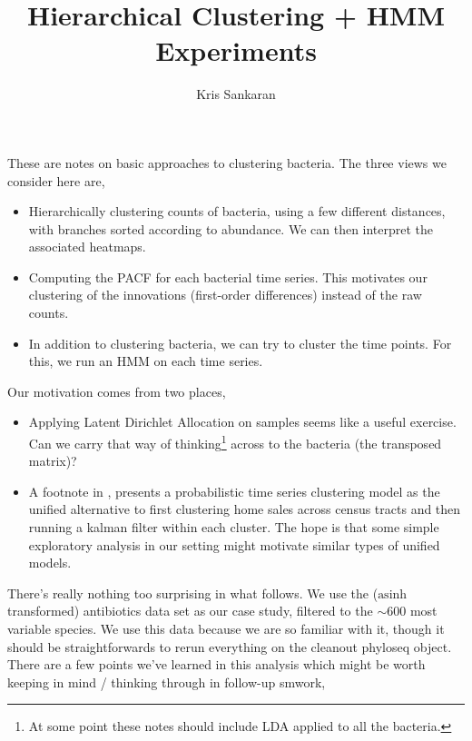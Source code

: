 \documentclass{article}
\title{Hierarchical Clustering + HMM Experiments}
\author{Kris Sankaran}
\begin{document}
\maketitle

These are notes on basic approaches to clustering bacteria. The
three views we consider here are,

\begin{itemize}
\item Hierarchically clustering counts of bacteria, using a few different
  distances, with branches sorted according to abundance. We can then interpret
  the associated heatmaps.
\item Computing the PACF for each bacterial time series. This motivates our
  clustering of the innovations (first-order differences) instead of the raw counts.
\item In addition to clustering bacteria, we can try to cluster the time points.
  For this, we run an HMM on each time series.
\end{itemize}


Our motivation comes from two places,
\begin{itemize}
  \item Applying Latent Dirichlet Allocation on samples seems like a useful
    exercise. Can we carry that way of thinking\footnote{At some point these
      notes should include LDA applied to all the bacteria.} across to the
    bacteria (the transposed matrix)?
  \item A footnote in \citep{ren2015achieving}, presents a probabilistic time
    series clustering model as the unified alternative to first clustering home
    sales across census tracts and then running a kalman filter within each
    cluster. The hope is that some simple exploratory analysis in our setting
    might motivate similar types of unified models.
\end{itemize}

There's really nothing too surprising in what follows. We use the
($\text{asinh}$ transformed) antibiotics data set as our case study, filtered to
the $\sim 600$ most variable species. We use this data because we are so
familiar with it, though it should be straightforwards to rerun everything on
the cleanout phyloseq object. There are a few points we've learned in this
analysis which might be worth keeping in mind / thinking through in follow-up
smwork,
\end{document}
